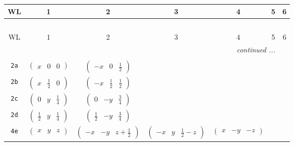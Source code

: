 \documentclass[fleqn,9pt,landscape]{jsarticle}
\begin{document}
\begin{center}
\renewcommand{\arraystretch}{1.2}
\begin{longtable}{ccccccc}
 \hline \hline
WL & 1 & 2 & 3 & 4 & 5 & 6 \\ \hline \endfirsthead

\multicolumn{6}{l}{\tablename\ \thetable{}} \\
 \hline \hline
WL & 1 & 2 & 3 & 4 & 5 & 6 \\ \hline \endhead

 \hline \hline
\multicolumn{6}{r}{\footnotesize\it continued ...} \\ \endfoot

 \hline \hline
\multicolumn{6}{r}{} \\ \endlastfoot

{\tt 2a} & $ \begin{pmatrix} x & 0 & 0 \end{pmatrix} $ & $ \begin{pmatrix} - x & 0 & \frac{1}{2} \end{pmatrix} $ & $  $ & $  $ \\ \hline
{\tt 2b} & $ \begin{pmatrix} x & \frac{1}{2} & 0 \end{pmatrix} $ & $ \begin{pmatrix} - x & \frac{1}{2} & \frac{1}{2} \end{pmatrix} $ & $  $ & $  $ \\ \hline
{\tt 2c} & $ \begin{pmatrix} 0 & y & \frac{1}{4} \end{pmatrix} $ & $ \begin{pmatrix} 0 & - y & \frac{3}{4} \end{pmatrix} $ & $  $ & $  $ \\ \hline
{\tt 2d} & $ \begin{pmatrix} \frac{1}{2} & y & \frac{1}{4} \end{pmatrix} $ & $ \begin{pmatrix} \frac{1}{2} & - y & \frac{3}{4} \end{pmatrix} $ & $  $ & $  $ \\ \hline
{\tt 4e} & $ \begin{pmatrix} x & y & z \end{pmatrix} $ & $ \begin{pmatrix} - x & - y & z + \frac{1}{2} \end{pmatrix} $ & $ \begin{pmatrix} - x & y & \frac{1}{2} - z \end{pmatrix} $ & $ \begin{pmatrix} x & - y & - z \end{pmatrix} $ \\
\end{longtable}
\end{center}
\end{document}
